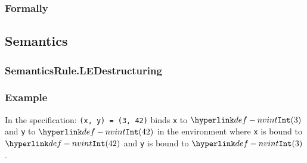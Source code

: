 \subsubsection{Formally}
\begin{mathpar}
\end{mathpar}

\subsection{Semantics}
\subsubsection{SemanticsRule.LEDestructuring\label{sec:SemanticsRule.LEDestructuring}}
\subsubsection{Example}
In the specification:
\texttt{(x, y) = (3, 42)} binds \texttt{x} to $\nvint(3)$ and \texttt{y} to
$\nvint(42)$ in the environment where \texttt{x} is bound to $\nvint(42)$ and \texttt{y} is bound to $\nvint(3)$.

